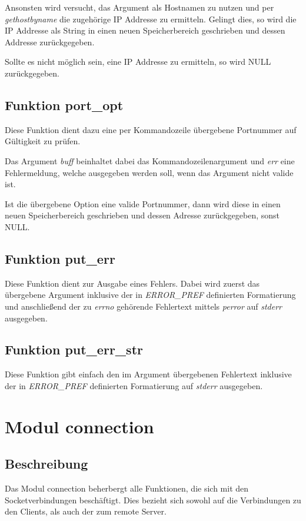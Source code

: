 \documentclass[pdftex,final,a4paper,10pt,notitlepage,halfparskip]{scrreprt}
\begin{document}
Ansonsten wird versucht, das Argument als Hostnamen zu nutzen und per \textit{gethostbyname} die zugehörige IP Addresse zu ermitteln. Gelingt dies, so wird die IP Addresse als String in einen neuen Speicherbereich geschrieben und dessen Addresse zurückgegeben.

Sollte es nicht möglich sein, eine IP Addresse zu ermitteln, so wird NULL zurückgegeben.
\subsection{Funktion port\_opt}\label{fn:port_opt}
Diese Funktion dient dazu eine per Kommandozeile übergebene Portnummer auf Gültigkeit zu prüfen.

Das Argument \textit{buff} beinhaltet dabei das Kommandozeilenargument und \textit{err} eine Fehlermeldung, welche ausgegeben werden soll, wenn das Argument nicht valide ist.

Ist die übergebene Option eine valide Portnummer, dann wird diese in einen neuen Speicherbereich geschrieben und dessen Adresse zurückgegeben, sonst NULL.

\subsection{Funktion put\_err}\label{fn:put_err}
Diese Funktion dient zur Ausgabe eines Fehlers. Dabei wird zuerst das übergebene Argument inklusive der in \textit{ERROR\_PREF} definierten Formatierung und anschließend der zu \textit{errno} gehörende Fehlertext mittels \textit{perror} auf \textit{stderr} ausgegeben.

\subsection{Funktion put\_err\_str}\label{fn:put_err_str}
Diese Funktion gibt einfach den im Argument übergebenen Fehlertext inklusive der in \textit{ERROR\_PREF} definierten Formatierung auf \textit{stderr} ausgegeben.

\section{Modul connection}\label{mod:connection}
\subsection{Beschreibung}
Das Modul connection beherbergt alle Funktionen, die sich mit den Socketverbindungen beschäftigt. Dies bezieht sich sowohl auf die Verbindungen zu den Clients, als auch der zum remote Server.
\end{document}
